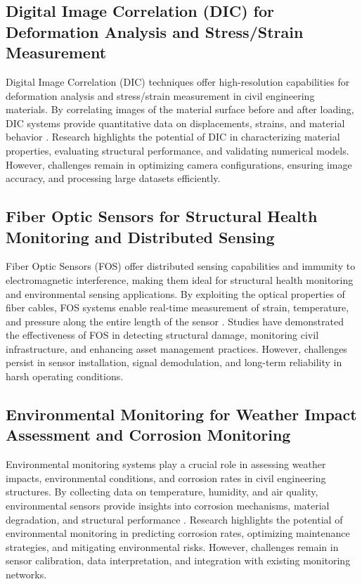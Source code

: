 \documentclass[journal, a4paper]{IEEEtran}
\begin{document}
\subsection{Digital Image Correlation (DIC) for Deformation Analysis and Stress/Strain Measurement}
Digital Image Correlation (DIC) techniques offer high-resolution capabilities for deformation analysis and
stress/strain measurement in civil engineering materials. By correlating images of the material surface before
and after loading, DIC systems provide quantitative data on displacements, strains, and material behavior
\cite{sanchez-romate_structural_2021} \cite{pachon_evaluation_2020} \cite{de_menezes_defect_2021}.
Research highlights the potential of DIC in characterizing material properties, evaluating structural performance,
and validating numerical models. However, challenges remain in optimizing camera configurations, ensuring image accuracy,
and processing large datasets efficiently. 

\subsection{Fiber Optic Sensors for Structural Health Monitoring and Distributed Sensing}
Fiber Optic Sensors (FOS) offer distributed sensing capabilities and immunity to electromagnetic interference,
making them ideal for structural health monitoring and environmental sensing applications. By exploiting the
optical properties of fiber cables, FOS systems enable real-time measurement of strain, temperature, and pressure
along the entire length of the sensor \cite{zhang_spatial_2023} \cite{willmann_health_2023} \cite{zhang_structural_2021}. Studies have demonstrated the effectiveness of FOS in
detecting structural damage, monitoring civil infrastructure, and enhancing asset management practices. However,
challenges persist in sensor installation, signal demodulation, and long-term reliability in harsh operating conditions. 

\subsection{Environmental Monitoring for Weather Impact Assessment and Corrosion Monitoring}
Environmental monitoring systems play a crucial role in assessing weather impacts, environmental conditions,
and corrosion rates in civil engineering structures. By collecting data on temperature, humidity, and air quality,
environmental sensors provide insights into corrosion mechanisms, material degradation, and structural performance
\cite{parida_comparative_2023} \cite{dong_ultrasonic_2022} \cite{wang_fatigue_2023}. Research highlights the potential of environmental monitoring in predicting corrosion rates,
optimizing maintenance strategies, and mitigating environmental risks. However, challenges remain in sensor calibration,
data interpretation, and integration with existing monitoring networks. 
\end{document}
